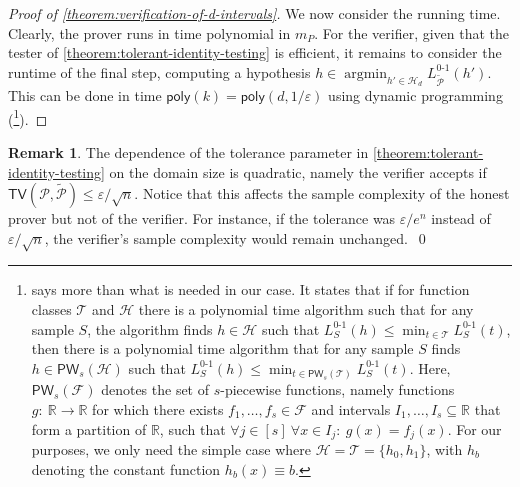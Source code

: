 \documentclass[11pt]{article}
\numberwithin{equation}{section}
\theoremstyle{definition}
\newtheorem{remark}[theorem]{Remark}
\theoremstyle{plain}
\theoremstyle{definition}\newtheorem{notation}[theorem]{Notation}\theoremstyle{plain}\raggedbottom
\newcommand{\roundBrackets}[1]{
	\mathopen{}\left(#1\right)\mathclose{}
}
\newcommand{\customFunctionRound}[2]{
	#1\roundBrackets{#2}
}
\newcommand{\sfFunction}[2]{
	\customFunctionRound{\mathsf{#1}}{#2}
}
\newcommand{\argmin}{\operatorname{argmin}}
\newcommand{\LossIndicator}[2]{\LossIndicatorNameEmpty_{#1}\roundBrackets{#2}}
\newcommand{\LossIndicatorNameEmpty}{L^{0\text{-}1}}
\newcommand{\poly}[1]{\sfFunction{poly}{#1}}
\newcommand{\TV}[1]{\sfFunction{TV}{#1}}
\newcommand{\bbR}{\mathbb{R}}
\newcommand{\cF}{\mathcal{F}}
\newcommand{\cH}{\mathcal{H}}
\newcommand{\cP}{\mathcal{P}}
\newcommand{\cT}{\mathcal{T}}
\newcommand{\1}{\mathds{1}}
\newcommand{\mP}{m_{\scriptscriptstyle P}}
\begin{document}
\begin{proof}[Proof of \cref{theorem:verification-of-d-intervals}]
	We now consider %
the running time.  %
Clearly, the prover runs in time polynomial in $\mP$. For the verifier, given that the tester of \cref{theorem:tolerant-identity-testing} is efficient, it remains to consider the runtime of the final step, computing a hypothesis $h \in \argmin_{h' \in \cH_d} \LossIndicator{\tilde{\cP}}{h'}$. This can be done in time $\poly{k} = \poly{d, 1/\varepsilon}$ using dynamic programming %
(\cite[Theorem 4]{DBLP:journals/ml/KearnsSS94}\footnote{%
%
%
\cite[Theorem 4]{DBLP:journals/ml/KearnsSS94}  %
%
says more than what is needed in our case. It states that if for function classes $\cT$ and $\cH$ there is a polynomial time algorithm such that for any sample $S$, the algorithm finds $h \in \cH$ such that $\LossIndicator{S}{h} \leq \min_{t \in \cT}\LossIndicator{S}{t}$, then there is a polynomial time algorithm that for any sample $S$ finds $h \in \mathsf{PW}_s(\cH)$ such that $\LossIndicator{S}{h} \leq \min_{t \in \mathsf{PW}_s(\cT)}\LossIndicator{S}{t}$. Here, $\mathsf{PW}_s(\cF)$ denotes the set of $s$-piecewise functions, namely functions $g: ~ \bbR \to \bbR$ for which there exists $f_1,\dots,f_s \in \cF$ and intervals $I_1,\dots,I_s \subseteq \bbR$ that form a partition of $\bbR$, such that $\forall j \in [s] ~ \forall x \in I_j: ~ g(x) = f_j(x)$. For our purposes, we only need the simple case where $\cH = \cT = \{h_0,h_1\}$, with $h_b$ denoting the constant function $h_b(x) \equiv b$.%
	}).
\end{proof}

%

\begin{remark}
	The dependence of the tolerance parameter in \cref{theorem:tolerant-identity-testing} on the domain size is quadratic, namely the verifier accepts if $\TV{\cP,\tilde{\cP}} \leq \varepsilon/\sqrt{n}$. Notice that this affects the sample complexity of the honest prover but not of the verifier. For instance, if the tolerance was $\varepsilon/e^n$ instead of $\varepsilon/\sqrt{n}$, the verifier's sample complexity would remain unchanged.~\qed
\end{remark}

%

%
\end{document}
